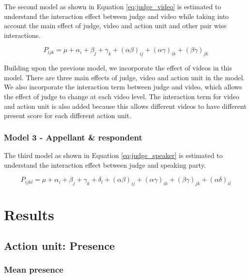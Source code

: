 \documentclass{monashthesis}
\begin{document}
The second model as shown in Equation \ref{eq:judge_video} is estimated to understand the interaction effect between judge and video while taking into account the main effect of judge, video and action unit and other pair wise interactions.

\begin{equation}\label{eq:judge_video}
P_{ijk} = \mu + \alpha_i + \beta_j +\gamma_k + (\alpha\beta)_{ij} + (\alpha\gamma)_{ik} + (\beta\gamma)_{jk}
\end{equation}

Building upon the previous model, we incorporate the effect of videos in this model. There are three main effects of judge, video and action unit in the model. We also incorporate the interaction term between judge and video, which allows the effect of judge to change at each video level. The interaction term for video and action unit is also added because this allows different videos to have different present score for each different action unit.

\hypertarget{model-3---appellant-respondent}{%
\subsection{Model 3 - Appellant \& respondent}\label{model-3---appellant-respondent}}

The third model as shown in Equation \ref{eq:judge_speaker} is estimated to understand the interaction effect between judge and speaking party.

\begin{equation}\label{eq:judge_speaker}
P_{ijkl} = \mu + \alpha_i + \beta_j +\gamma_k + \delta_l + (\alpha\beta)_{ij} + (\alpha\gamma)_{ik} + (\beta\gamma)_{jk} + (\alpha\delta)_{il}
\end{equation}

\hypertarget{results}{%
\chapter{Results}\label{results}}

\hypertarget{action-unit-presence}{%
\section{Action unit: Presence}\label{action-unit-presence}}

\hypertarget{mean-presence}{%
\subsection{Mean presence}\label{mean-presence}}
\end{document}
